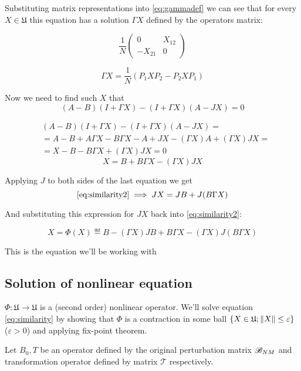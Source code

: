 \documentclass{article}
\begin{document}
Substituting matrix representations into \eqref{eq:gammadef} we can see
that for every \( X \in \mathfrak U \) this equation has a solution \( \Gamma X \)
defined by the operators matrix:

\[
\frac{1}{N}
\begin{pmatrix}
    0       & X_{12} \\
    -X_{21} & 0
\end{pmatrix}
\]

\[\Gamma X = \frac{1}{N} (P_1 X P_2 - P_2 X P_1)\]

Now we need to find such \( X \) that
\begin{equation}\label{eq:similarity1}
    (A - B)(I + \Gamma X) - (I + \Gamma X)(A - JX) = 0
\end{equation}

\[\begin{aligned}
    & (A - B)(I + \Gamma X) - (I + \Gamma X)(A - JX) = \\
    & = A - B + A\Gamma X - B\Gamma X - A + JX - (\Gamma X) A + (\Gamma X) JX = \\
    & = X - B - B\Gamma X + (\Gamma X) JX = 0
\end{aligned}\]
\begin{equation}\label{eq:similarity2}
    X = B + B\Gamma X - (\Gamma X) JX
\end{equation}

Applying \( J \) to both sides of the last equation we get
\[\eqref{eq:similarity2} \implies
JX = JB + J(B\Gamma X)\]

And substituting this expression for \( JX \) back into \eqref{eq:similarity2}:

\begin{equation}\label{eq:similarity}
    X = \Phi(X) \eqdef B - (\Gamma X) JB + B\Gamma X - (\Gamma X) J(B\Gamma X)
\end{equation}

This is the equation we'll be working with

\subsection{Solution of nonlinear equation}
\( \Phi:\mathfrak U\to\mathfrak U \) is a (second order) nonlinear operator.
We'll solve equation \eqref{eq:similarity}
by showing that \( \Phi \) is a contraction in some ball \( \{ X\in \mathfrak U; \left\|{X}\right\| \leq \varepsilon \} \) (\( \varepsilon>0 \))
and applying fix-point theorem.

Let \( B_0, T \) be an operator defined by the original perturbation matrix \( \mathscr{B}_{{N}{M}} \)
and transformation operator defined by matrix \( \mathcal T \) respectively.
\end{document}
